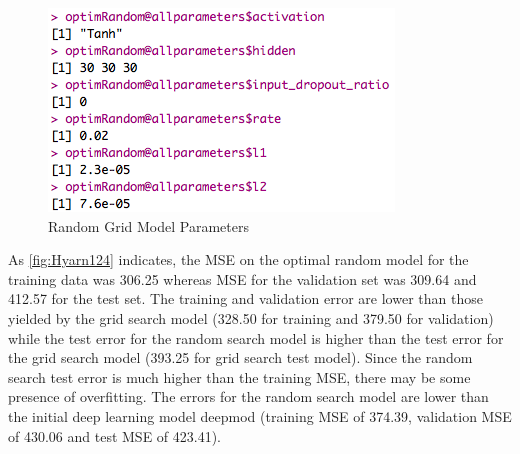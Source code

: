 \documentclass[12pt,twoside]{amherstthesis}
\begin{document}
  \begin{Shaded}
  \end{Shaded}
  
  \begin{figure}[htbp]
  \centering
  \includegraphics[scale = 0.7,angle = 0]{figure/optimRandomParam.png}
  \caption[Random Grid Model Parameters]{\normalsize{Random Grid Model Parameters}}
  \label{fig:Hyarn111}
  \end{figure}
  
  As \autoref{fig:Hyarn124} indicates, the MSE on the optimal random model
  for the training data was 306.25 whereas MSE for the validation set was
  309.64 and 412.57 for the test set. The training and validation error
  are lower than those yielded by the grid search model (328.50 for
  training and 379.50 for validation) while the test error for the random
  search model is higher than the test error for the grid search model
  (393.25 for grid search test model). Since the random search test error
  is much higher than the training MSE, there may be some presence of
  overfitting. The errors for the random search model are lower than the
  initial deep learning model deepmod (training MSE of 374.39, validation
  MSE of 430.06 and test MSE of 423.41).
  
\end{document}
